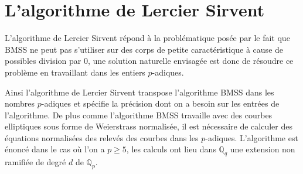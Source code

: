 \documentclass[10pt,a4paper]{book}
\theoremstyle{plain}
\theoremstyle{definition}
\theoremstyle{definition}
\theoremstyle{definition}
\theoremstyle{definition}
\theoremstyle{definition}
\theoremstyle{remark}
\theoremstyle{remark}
\theoremstyle{definition}
\begin{document}


\section{L'algorithme de Lercier Sirvent}
L'algorithme de Lercier Sirvent répond à la problématique posée par le fait que BMSS ne peut pas s'utiliser sur des corps de petite caractéristique à cause de possibles division par $0$, une solution naturelle envisagée est donc de résoudre ce problème en travaillant dans les entiers $p$-adiques.

Ainsi l'algorithme de Lercier Sirvent transpose l'algorithme BMSS dans les 
nombres $p$-adiques et spécifie la précision dont on a besoin sur les entrées 
de l'algorithme. De plus comme l'algorithme  BMSS travaille avec des courbes 
elliptiques sous forme de Weierstrass normalisée, il est nécessaire de calculer
des équations normalisées des relevés des courbes dans les $p$-adiques. 
L'algorithme est énoncé dans le cas où l'on a $p \geqslant 5$, les calculs ont 
lieu dans $\mathbb{Q}_q$ une extension non ramifiée de degré $d$ de $\mathbb{Q}_p$.
\end{document}
